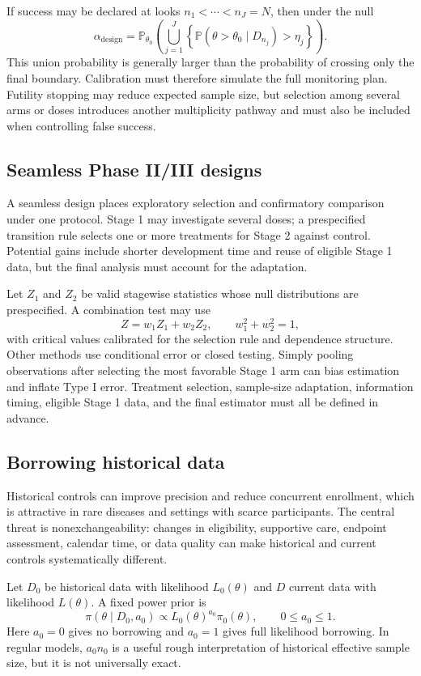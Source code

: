 \documentclass[12pt,oneside]{book}
\numberwithin{equation}{section}
\theoremstyle{definition}
\theoremstyle{plain}
\theoremstyle{remark}
\newcommand{\Prob}{\mathbb{P}}
\begin{document}
If success may be declared at looks $n_1<\cdots<n_J=N$, then under the null
\[
 \alpha_{\mathrm{design}}
 =\Prob_{\theta_0}\!\left(
   \bigcup_{j=1}^J
   \left\{\Prob(\theta>\theta_0\mid D_{n_j})>\eta_j\right\}
 \right).
\]
This union probability is generally larger than the probability of crossing
only the final boundary.  Calibration must therefore simulate the full
monitoring plan.  Futility stopping may reduce expected sample size, but
selection among several arms or doses introduces another multiplicity pathway
and must also be included when controlling false success.

\subsection{Seamless Phase II/III designs}

A seamless design places exploratory selection and confirmatory comparison
under one protocol.  Stage 1 may investigate several doses; a prespecified
transition rule selects one or more treatments for Stage 2 against control.
Potential gains include shorter development time and reuse of eligible Stage 1
data, but the final analysis must account for the adaptation.

Let $Z_1$ and $Z_2$ be valid stagewise statistics whose null distributions are
prespecified.  A combination test may use
\[
  Z=w_1Z_1+w_2Z_2,
  \qquad w_1^2+w_2^2=1,
\]
with critical values calibrated for the selection rule and dependence
structure.  Other methods use conditional error or closed testing.  Simply
pooling observations after selecting the most favorable Stage 1 arm can bias
estimation and inflate Type I error.  Treatment selection, sample-size
adaptation, information timing, eligible Stage 1 data, and the final estimator
must all be defined in advance.

\subsection{Borrowing historical data}

Historical controls can improve precision and reduce concurrent enrollment,
which is attractive in rare diseases and settings with scarce participants.
The central threat is nonexchangeability: changes in eligibility, supportive
care, endpoint assessment, calendar time, or data quality can make historical
and current controls systematically different.

Let $D_0$ be historical data with likelihood $L_0(\theta)$ and $D$ current data
with likelihood $L(\theta)$.  A fixed power prior is
\begin{equation}
  \pi(\theta\mid D_0,a_0)
  \propto L_0(\theta)^{a_0}\pi_0(\theta),
  \qquad 0\le a_0\le1.
  \label{eq:power-prior}
\end{equation}
Here $a_0=0$ gives no borrowing and $a_0=1$ gives full likelihood borrowing.
In regular models, $a_0n_0$ is a useful rough interpretation of historical
effective sample size, but it is not universally exact.
\end{document}
